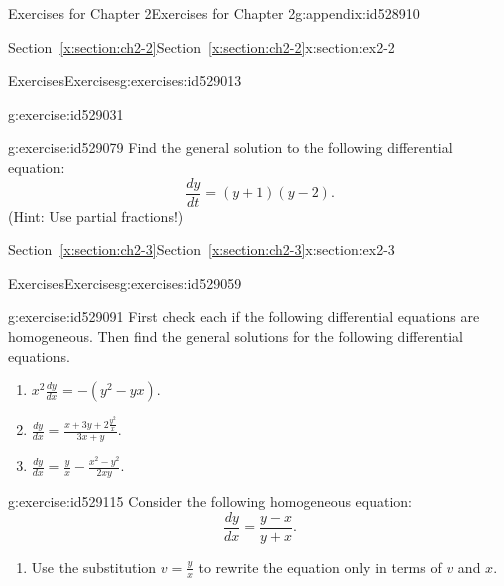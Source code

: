\documentclass[oneside,10pt,]{book}
\newcommand{\xreffont}{\relax}
\numberwithin{equation}{section}
\numberwithin{equation}{section}
\begin{document}
\begin{appendixptx}{Exercises for Chapter 2}{}{Exercises for Chapter 2}{}{}{g:appendix:id528910}
\begin{sectionptx}{Section~{\xreffont\ref*{x:section:ch2-2}}}{}{Section~{\xreffont\ref*{x:section:ch2-2}}}{}{}{x:section:ex2-2}
\begin{exercises-subsection-numberless}{Exercises}{}{Exercises}{}{}{g:exercises:id529013}
\begin{divisionexercise}{2}{}{}{g:exercise:id529031}
\begin{enumerate}[label=(\alph*)]
\end{enumerate}
\end{divisionexercise}%
\begin{divisionexercise}{3}{}{}{g:exercise:id529079}%
Find the general solution to the following differential equation:%
\begin{equation*}
\frac{dy}{dt}=\left(y+1\right)\left(y-2\right).
\end{equation*}
(Hint: Use partial fractions!)%
\end{divisionexercise}%
\end{exercises-subsection-numberless}
\end{sectionptx}
%
%
\typeout{************************************************}
\typeout{Section C.3 Section~{\xreffont\ref*{x:section:ch2-3}}}
\typeout{************************************************}
%
\begin{sectionptx}{Section~{\xreffont\ref*{x:section:ch2-3}}}{}{Section~{\xreffont\ref*{x:section:ch2-3}}}{}{}{x:section:ex2-3}
%
%
\typeout{************************************************}
\typeout{************************************************}
%
\begin{exercises-subsection-numberless}{Exercises}{}{Exercises}{}{}{g:exercises:id529059}
\begin{divisionexercise}{1}{}{}{g:exercise:id529091}%
First check each if the following differential equations are homogeneous. Then find the general solutions for the following differential equations.%
\begin{enumerate}[label=(\alph*)]
\item{}\(\displaystyle x^{2}\frac{dy}{dx}=-\left(y^{2}-yx\right).\)%
\item{}\(\displaystyle \frac{dy}{dx}=\frac{x+3y+2\frac{y^{2}}{x}}{3x+y}.\)%
\item{}\(\displaystyle \frac{dy}{dx}=\frac{y}{x}-\frac{x^{2}-y^{2}}{2xy}.\)%
\end{enumerate}
%
\end{divisionexercise}%
\begin{divisionexercise}{2}{}{}{g:exercise:id529115}%
Consider the following homogeneous equation:%
\begin{equation*}
\frac{dy}{dx}=\frac{y-x}{y+x}.
\end{equation*}
%
\begin{enumerate}[label=(\alph*)]
\item{}Use the substitution \(v=\frac{y}{x}\) to rewrite the equation only in terms of \(v\) and \(x\).%

\end{enumerate}
\end{divisionexercise}
\end{exercises-subsection-numberless}
\end{sectionptx}
\end{appendixptx}
\end{document}
